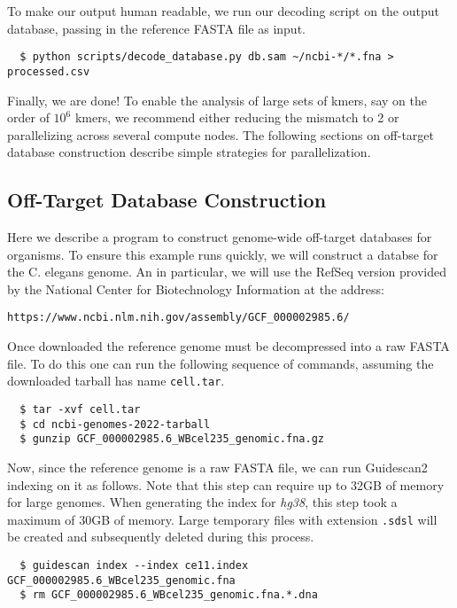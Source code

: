 \documentclass[11pt]{article}
\begin{document}
To make our output human readable, we run our decoding script on the
output database, passing in the reference FASTA file as input.
\vspace{-0.8em}
\begin{verbatim}
  $ python scripts/decode_database.py db.sam ~/ncbi-*/*.fna > processed.csv
\end{verbatim}

Finally, we are done! To enable the analysis of large sets of kmers,
say on the order of $10^6$ kmers, we recommend either reducing the
mismatch to 2 or parallelizing across several compute nodes. The
following sections on off-target database construction describe simple
strategies for parallelization.

\subsection{Off-Target Database Construction}
\label{subsec:offtargetdb}

Here we describe a program to construct genome-wide off-target
databases for organisms. To ensure this example runs quickly, we will
construct a databse for the C. elegans genome. An in particular, we
will use the RefSeq version provided by the National Center for
Biotechnology Information at the address:

\begin{center}
  \texttt{https://www.ncbi.nlm.nih.gov/assembly/GCF\_000002985.6/}
\end{center}

Once downloaded the reference genome must be decompressed into a raw
FASTA file.  To do this one can run the following sequence of
commands, assuming the downloaded tarball has name \texttt{cell.tar}.

\begin{verbatim}
  $ tar -xvf cell.tar
  $ cd ncbi-genomes-2022-tarball
  $ gunzip GCF_000002985.6_WBcel235_genomic.fna.gz
\end{verbatim}

Now, since the reference genome is a raw FASTA file, we can run
Guidescan2 indexing on it as follows. Note that this step can require
up to 32GB of memory for large genomes. When generating the index for
\textit{hg38}, this step took a maximum of 30GB of memory. Large
temporary files with extension \texttt{.sdsl} will be created and
subsequently deleted during this process.

\begin{verbatim}
  $ guidescan index --index ce11.index GCF_000002985.6_WBcel235_genomic.fna
  $ rm GCF_000002985.6_WBcel235_genomic.fna.*.dna
\end{verbatim}
\end{document}
